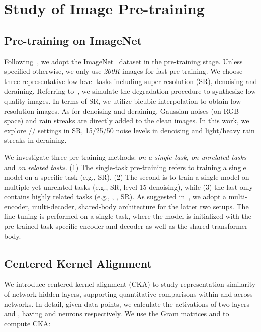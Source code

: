 \documentclass[runningheads]{llncs}
\makeatletter
\newcommand*{\eg}{e.g.\@\xspace}
\makeatother
\begin{document}
\section{Study of Image Pre-training}
	\label{sec:pre}
	
	\subsection{Pre-training on ImageNet}
	\label{sec:imagenet}
	
	Following~\cite{chen2021pre}, we adopt the ImageNet~\cite{deng2009imagenet} dataset in the pre-training stage. Unless specified otherwise, we only use \textit{200K} images for fast pre-training. We choose three representative low-level tasks including super-resolution (SR), denoising and deraining. Referring to~\cite{chen2021pre,agustsson2017ntire,gu2017joint}, we simulate the degradation procedure to synthesize low quality images. In terms of SR, we utilize bicubic interpolation to obtain low-resolution images. As for denoising and deraining, Gaussian noises (on RGB space) and rain streaks are directly added to the clean images. In this work, we explore // settings in SR, 15/25/50 noise levels in denoising and light/heavy rain streaks in deraining.
	
	We investigate three pre-training methods:  \textit{on a single task, on unrelated tasks} and \textit{on related tasks}. (1) The single-task pre-training refers to training a single model on a specific task (\eg,  SR). (2) The second is to train a single model on multiple yet unrelated tasks  (\eg,  SR,  level-15 denoising), while (3) the last only contains highly related tasks (\eg, , ,  SR). As suggested in~\cite{chen2021pre}, we adopt a multi-encoder, multi-decoder, shared-body architecture for the latter two setups. The fine-tuning is performed on a single task, where the model is initialized with the pre-trained task-specific encoder and decoder as well as the shared transformer body. 

	\subsection{Centered Kernel Alignment}
	\label{sec:preparation}
	We introduce centered kernel alignment (CKA)\cite{kornblith2019better,cortes2012algorithms,raghu2021vision} to study representation similarity of network hidden layers, supporting quantitative comparisons within and across networks. In detail, given  data points, we calculate the activations of two layers  and , having  and  neurons respectively. We use the Gram matrices  and  to compute CKA:
	
\end{document}
